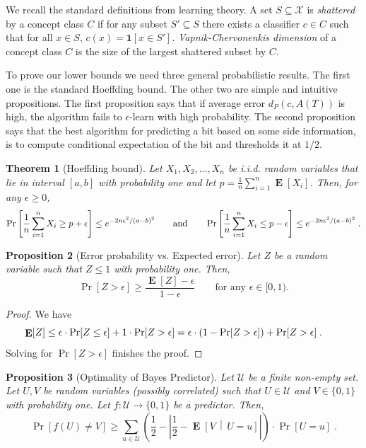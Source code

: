 \documentclass[10pt]{article}
\newtheorem{proposition}{Proposition}
\newtheorem{theorem}[proposition]{Theorem}
\newcommand{\U}{\mathcal{U}}
\newcommand{\X}{\mathcal{X}}
\newcommand{\indicator}[1]{\mathbf{1}\left[{#1}\right]}
\DeclareMathOperator{\Exp}{\mathbf{E}}
\begin{document}
We recall the standard definitions from learning theory.  A set $S \subseteq \X$
is \emph{shattered} by a concept class $C$ if for any subset $S' \subseteq S$
there exists a classifier $c \in C$ such that for all $x \in S$, $c(x) =
\indicator{x \in S'}$. \emph{Vapnik-Chervonenkis dimension} of a concept class
$C$ is the size of the largest shattered subset by $C$.

To prove our lower bounds we need three general probabilistic results. The first
one is the standard Hoeffding bound. The other two are simple and intuitive
propositions. The first proposition says that if average error $d_P(c,A(T))$ is
high, the algorithm fails to $\epsilon$-learn with high probability. The second
proposition says that the best algorithm for predicting a bit based on some side
information, is to compute conditional expectation of the bit and thresholds it
at $1/2$.

\begin{theorem}[Hoeffding bound]
Let $X_1, X_2, \dots, X_n$ be i.i.d. random variables that lie in interval
$[a,b]$ with probability one and let $p=\frac{1}{n}\sum_{i=1}^n \Exp[X_i]$.
Then, for any $\epsilon \ge 0$,
$$
\Pr \left[{\frac {1}{n}} \sum_{i=1}^n X_i \ge p + \epsilon \right] \le e^{ - 2n \epsilon^2/(a-b)^2}  \qquad \text{and} \qquad
\Pr \left[{\frac {1}{n}} \sum_{i=1}^n X_i \le p - \epsilon \right] \le e^{ - 2n \epsilon^2/(a-b)^2}  \; . \\
$$
\end{theorem}

\begin{proposition}[Error probability vs. Expected error]
\label{proposition:error-probability-vs-expected-error}
Let $Z$ be a random variable such that $Z \le 1$ with probability one.
Then,
$$
\Pr[Z > \epsilon] \ge \frac{\Exp[Z] - \epsilon}{1 - \epsilon} \qquad \text{for any $\epsilon \in [0, 1)$.}
$$
\end{proposition}

\begin{proof}
We have
$$
\Exp[Z]
\le \epsilon \cdot \Pr[Z \le \epsilon] + 1 \cdot \Pr[Z > \epsilon]
= \epsilon \cdot (1 - \Pr[Z > \epsilon]) + \Pr[Z > \epsilon] \; .  \qquad \qedhere
$$
Solving for $\Pr[Z > \epsilon]$ finishes the proof.
\end{proof}

\begin{proposition}[Optimality of Bayes Predictor]
\label{proposition:bayes}
Let $\U$ be a finite non-empty set. Let $U,V$ be random variables (possibly
correlated) such that $U \in \U$ and $V \in \{0,1\}$ with probability one. Let
$f:\U \to \{0,1\}$ be a predictor. Then,
$$
\Pr\left[ f(U) \neq V \right]
\ge \sum_{u \in \U} \left( \frac{1}{2} - \left| \frac{1}{2} -  \Exp \left[V \, \middle| \, U = u\right] \right| \right) \cdot \Pr[U = u] \; .
$$
\end{proposition}
\end{document}
